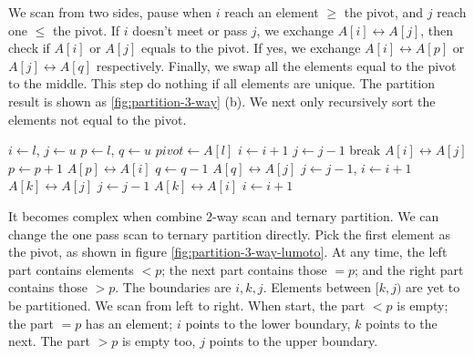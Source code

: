 \documentclass[b5paper]{article}
\begin{document}
We scan from two sides, pause when $i$ reach an element $\geq$ the pivot, and $j$ reach one $\leq$ the pivot. If $i$ doesn't meet or pass $j$, we exchange $A[i] \leftrightarrow A[j]$, then check if $A[i]$ or $A[j]$ equals to the pivot. If yes, we exchange $A[i] \leftrightarrow A[p]$ or $A[j] \leftrightarrow A[q]$ respectively. Finally, we swap all the elements equal to the pivot to the middle. This step do nothing if all elements are unique. The partition result is shown as \ref{fig:partition-3-way} (b). We next only recursively sort the elements not equal to the pivot.

\begin{algorithmic}[1]
    \State $i \gets l$, $j \gets u$
    \State $p \gets l$, $q \gets u$ 
    \State $pivot \gets A[l]$
    \Loop
      \Repeat
        \State $i \gets i + 1$
       
      \Repeat
        \State $j \gets j - 1$
       
        \State break
      \EndIf
      \State {} $A[i] \leftrightarrow A[j]$
       
        \State $p \gets p + 1$
        \State {} $A[p] \leftrightarrow A[i]$
      \EndIf
        \State $q \gets q - 1$
        \State {} $A[q] \leftrightarrow A[j]$
      \EndIf
    \EndLoop
      \State $j \gets j - 1$, $i \gets i + 1$
    \EndIf
     
      \State {} $A[k] \leftrightarrow A[j]$
      \State $j \gets j - 1$
    \EndFor
      \State {} $A[k] \leftrightarrow A[i]$
      \State $i \gets i + 1$
    \EndFor
    \State {}
    \State {}
  \EndIf
\EndProcedure
\end{algorithmic}

It becomes complex when combine 2-way scan and ternary partition. We can change the one pass scan to ternary partition directly. Pick the first element as the pivot, as shown in figure \ref{fig:partition-3-way-lumoto}. At any time, the left part contains elements $< p$; the next part contains those $= p$; and the right part contains those $> p$. The boundaries are $i, k, j$. Elements between $[k, j)$ are yet to be partitioned. We scan from left to right. When start, the part $< p$ is empty; the part $= p$ has an element; $i$ points to the lower boundary, $k$ points to the next. The part $> p$ is empty too, $j$ points to the upper boundary.
\end{document}
